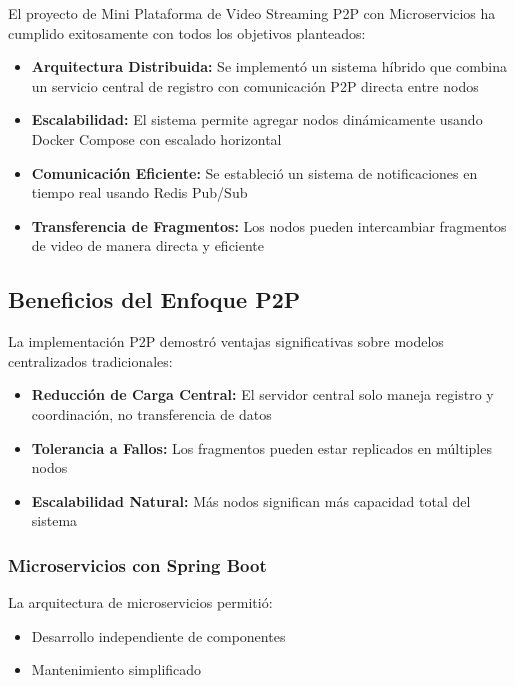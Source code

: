 

El proyecto de Mini Plataforma de Video Streaming P2P con Microservicios ha cumplido exitosamente con todos los objetivos planteados:

\begin{itemize}
    \item \textbf{Arquitectura Distribuida:} Se implementó un sistema híbrido que combina un servicio central de registro con comunicación P2P directa entre nodos
    \item \textbf{Escalabilidad:} El sistema permite agregar nodos dinámicamente usando Docker Compose con escalado horizontal
    \item \textbf{Comunicación Eficiente:} Se estableció un sistema de notificaciones en tiempo real usando Redis Pub/Sub
    \item \textbf{Transferencia de Fragmentos:} Los nodos pueden intercambiar fragmentos de video de manera directa y eficiente
\end{itemize}

\subsection*{Beneficios del Enfoque P2P}

La implementación P2P demostró ventajas significativas sobre modelos centralizados tradicionales:

\begin{itemize}
    \item \textbf{Reducción de Carga Central:} El servidor central solo maneja registro y coordinación, no transferencia de datos
    \item \textbf{Tolerancia a Fallos:} Los fragmentos pueden estar replicados en múltiples nodos
    \item \textbf{Escalabilidad Natural:} Más nodos significan más capacidad total del sistema
\end{itemize}


\subsubsection*{Microservicios con Spring Boot}
La arquitectura de microservicios permitió:
\begin{itemize}
    \item Desarrollo independiente de componentes
    \item Mantenimiento simplificado
\end{itemize}

